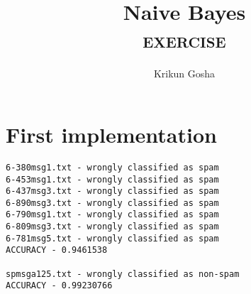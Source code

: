 \documentclass{article}
\title{Naive Bayes \\ \textsc{exercise}}
\author{Krikun Gosha}
\begin{document}
\maketitle

\section{First implementation}

\begin{verbatim}
6-380msg1.txt - wrongly classified as spam
6-453msg1.txt - wrongly classified as spam
6-437msg3.txt - wrongly classified as spam
6-890msg3.txt - wrongly classified as spam
6-790msg1.txt - wrongly classified as spam
6-809msg3.txt - wrongly classified as spam
6-781msg5.txt - wrongly classified as spam
ACCURACY - 0.9461538

spmsga125.txt - wrongly classified as non-spam
ACCURACY - 0.99230766
\end{verbatim}
\end{document}
